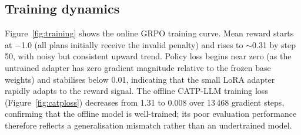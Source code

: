 \documentclass[10pt,twocolumn]{article}
\begin{document}
\begin{table}[h]
\centering
\caption{Per-task aligned results (score / time in ms).
Gray cells highlight tasks where online GRPO degrades task score.}
\label{tab:per_task}
\end{table}

\subsection{Training dynamics}

Figure~\ref{fig:training} shows the online GRPO training curve.
Mean reward starts at $-$1.0 (all plans initially receive the invalid
penalty) and rises to $\sim$0.31 by step 50, with noisy but consistent
upward trend.
Policy loss begins near zero (as the untrained adapter has zero gradient
magnitude relative to the frozen base weights) and stabilises below 0.01,
indicating that the small LoRA adapter rapidly adapts to the reward signal.
The offline CATP-LLM training loss (Figure~\ref{fig:catploss}) decreases from
1.31 to 0.008 over 13\,468 gradient steps, confirming that the offline model
is well-trained; its poor evaluation performance therefore reflects a
generalisation mismatch rather than an undertrained model.
\end{document}
